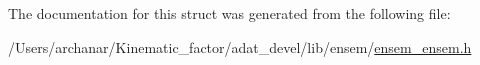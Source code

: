 The documentation for this struct was generated from the following file\+:\begin{DoxyCompactItemize}
\item 
/\+Users/archanar/\+Kinematic\+\_\+factor/adat\+\_\+devel/lib/ensem/\mbox{\hyperlink{lib_2ensem_2ensem__ensem_8h}{ensem\+\_\+ensem.\+h}}\end{DoxyCompactItemize}
